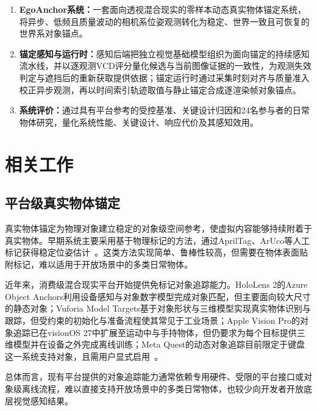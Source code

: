 \documentclass[review]{vgtc}
\begin{document}
\begin{enumerate}
  \item \textbf{EgoAnchor系统：}一套面向透视混合现实的零样本动态真实物体锚定系统，将异步、低频且质量波动的相机系位姿观测转化为稳定、世界一致且可恢复的世界系对象锚点。

  \item \textbf{锚定感知与运行时：}感知后端把独立视觉基础模型组织为面向锚定的持续感知流水线，并以逐观测VCD评分量化候选与当前图像证据的一致性，为观测失效判定与遮挡后的重新获取提供依据；锚定运行时通过采集时刻对齐与质量准入校正异步观测，再以时间索引轨迹取值与静止锚定合成逐渲染帧对象锚点。

  \item \textbf{系统评价：}通过具有平台参考的受控基准、关键设计归因和24名参与者的日常物体研究，量化系统性能、关键设计、响应代价及其感知效用。
\end{enumerate}

\section{相关工作}\label{sec:related-work}

\subsection{平台级真实物体锚定}

真实物体锚定为物理对象建立稳定的对象级空间参考，使虚拟内容能够持续附着于真实物体。早期系统主要采用基于物理标记的方法，通过AprilTag、ArUco等人工标记获得稳定位姿估计~\cite{kato1999artoolkit,olson2011apriltag,garridojurado2014aruco}。这类方法实现简单、鲁棒性较高，但需要在物体表面贴附标记，难以适用于开放场景中的多类日常物体。

近年来，消费级混合现实平台开始提供免标记对象追踪能力。HoloLens 2的Azure Object Anchors利用设备感知与对象数字模型完成对象匹配，但主要面向较大尺寸的静态对象；Vuforia Model Targets基于对象形状与三维模型实现真实物体识别与跟踪，但受约束的初始化与准备流程使其常见于工业场景；Apple Vision Pro的对象追踪已在visionOS 27中扩展至运动中与手持物体，但仍要求为每个目标提供三维模型并在设备之外完成离线训练；Meta Quest的动态对象追踪目前限定于键盘这一系统支持对象，且需用户显式启用~\cite{appleObjectAnchor,appleObjectTracking2026,azureObjectAnchors,vuforiaModelTargets,metaDynamicObjectTracker}。

总体而言，现有平台提供的对象追踪能力通常依赖专用硬件、受限的平台接口或对象级离线流程，难以直接支持开放场景中的多类日常物体，也较少向开发者开放底层视觉感知结果。
\end{document}
